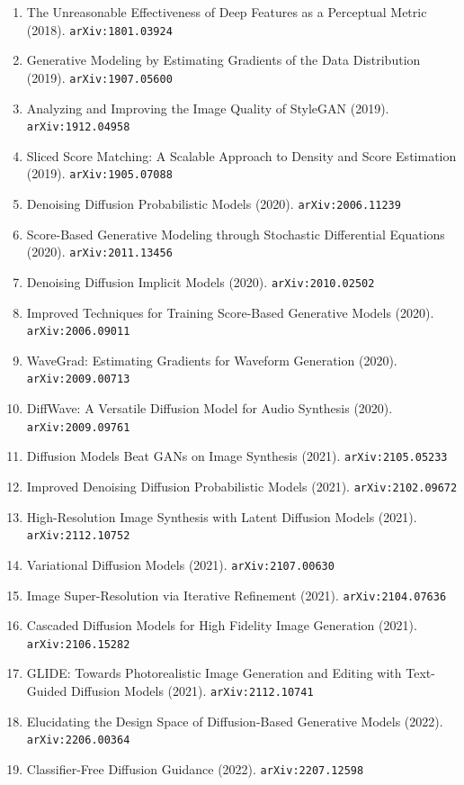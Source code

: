 \documentclass[11pt]{article}
\begin{document}
\begin{enumerate}
  \item The Unreasonable Effectiveness of Deep Features as a Perceptual Metric (2018). \texttt{arXiv:1801.03924}
  \item Generative Modeling by Estimating Gradients of the Data Distribution (2019). \texttt{arXiv:1907.05600}
  \item Analyzing and Improving the Image Quality of StyleGAN (2019). \texttt{arXiv:1912.04958}
  \item Sliced Score Matching: A Scalable Approach to Density and Score
  Estimation (2019). \texttt{arXiv:1905.07088}
  \item Denoising Diffusion Probabilistic Models (2020). \texttt{arXiv:2006.11239}
  \item Score-Based Generative Modeling through Stochastic Differential
  Equations (2020). \texttt{arXiv:2011.13456}
  \item Denoising Diffusion Implicit Models (2020). \texttt{arXiv:2010.02502}
  \item Improved Techniques for Training Score-Based Generative Models (2020). \texttt{arXiv:2006.09011}
  \item WaveGrad: Estimating Gradients for Waveform Generation (2020). \texttt{arXiv:2009.00713}
  \item DiffWave: A Versatile Diffusion Model for Audio Synthesis (2020). \texttt{arXiv:2009.09761}
  \item Diffusion Models Beat GANs on Image Synthesis (2021). \texttt{arXiv:2105.05233}
  \item Improved Denoising Diffusion Probabilistic Models (2021). \texttt{arXiv:2102.09672}
  \item High-Resolution Image Synthesis with Latent Diffusion Models (2021). \texttt{arXiv:2112.10752}
  \item Variational Diffusion Models (2021). \texttt{arXiv:2107.00630}
  \item Image Super-Resolution via Iterative Refinement (2021). \texttt{arXiv:2104.07636}
  \item Cascaded Diffusion Models for High Fidelity Image Generation (2021). \texttt{arXiv:2106.15282}
  \item GLIDE: Towards Photorealistic Image Generation and Editing with
  Text-Guided Diffusion Models (2021). \texttt{arXiv:2112.10741}
  \item Elucidating the Design Space of Diffusion-Based Generative Models (2022). \texttt{arXiv:2206.00364}
  \item Classifier-Free Diffusion Guidance (2022). \texttt{arXiv:2207.12598}

\end{enumerate}
\end{document}
